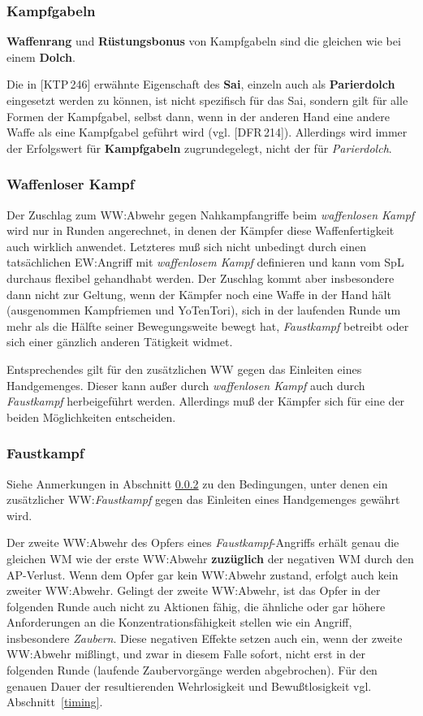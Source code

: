 \documentclass[10pt,a4paper,germanpar]{article}
\begin{document}
\subsubsection{Kampfgabeln}

\textbf{Waffenrang} und \textbf{Rüstungsbonus} von Kampfgabeln sind
die gleichen wie bei einem \textbf{Dolch}.

Die in [KTP\,246] erwähnte Eigenschaft des \textbf{Sai}, einzeln auch
als \textbf{Parierdolch} eingesetzt werden zu können, ist nicht
spezifisch für das Sai, sondern gilt für alle Formen der Kampfgabel,
selbst dann, wenn in der anderen Hand eine andere Waffe als eine
Kampfgabel geführt wird (vgl. [DFR\,214]). Allerdings wird immer der
Erfolgswert für \textbf{Kampfgabeln} zugrundegelegt, nicht der für
\emph{Parierdolch}.

\subsubsection{Waffenloser Kampf}
\label{wlk}

Der Zuschlag zum WW:Abwehr gegen Nahkampfangriffe beim
\emph{waffenlosen Kampf} wird nur in Runden angerechnet, in denen der
Kämpfer diese Waffenfertigkeit auch wirklich anwendet. Letzteres muß
sich nicht unbedingt durch einen tatsächlichen EW:Angriff mit
\emph{waffenlosem Kampf} definieren und kann vom SpL durchaus flexibel
gehandhabt werden. Der Zuschlag kommt aber insbesondere dann nicht zur
Geltung, wenn der Kämpfer noch eine Waffe in der Hand hält
(ausgenommen Kampfriemen und YoTenTori), sich in der laufenden
Runde um mehr als die Hälfte seiner Bewegungsweite bewegt hat,
\emph{Faustkampf} betreibt oder sich einer gänzlich anderen Tätigkeit
widmet.

Entsprechendes gilt für den zusätzlichen WW gegen das Einleiten eines
Handgemenges. Dieser kann außer durch \emph{waffenlosen Kampf} auch
durch \emph{Faustkampf} herbeigeführt werden. Allerdings muß der
Kämpfer sich für eine der beiden Möglichkeiten entscheiden.

\subsubsection{Faustkampf}

Siehe Anmerkungen in Abschnitt \ref{wlk} zu den Bedingungen, unter
denen ein zusätzlicher WW:\emph{Faustkampf} gegen das Einleiten eines
Handgemenges gewährt wird.

Der zweite WW:Abwehr des Opfers eines \emph{Faustkampf}-Angriffs
erhält genau die gleichen WM wie der erste WW:Abwehr
\textbf{zuzüglich} der negativen WM durch den AP-Verlust. Wenn dem
Opfer gar kein WW:Abwehr zustand, erfolgt auch kein zweiter
WW:Abwehr. Gelingt der zweite WW:Abwehr, ist das Opfer in der
folgenden Runde auch nicht zu Aktionen fähig, die ähnliche oder gar
höhere Anforderungen an die Konzentrationsfähigkeit stellen wie ein
Angriff, insbesondere \emph{Zaubern}. Diese negativen Effekte setzen
auch ein, wenn der zweite WW:Abwehr mißlingt, und zwar in diesem Falle
sofort, nicht erst in der folgenden Runde (laufende Zaubervorgänge
werden abgebrochen). Für den genauen Dauer der resultierenden
Wehrlosigkeit und Bewußtlosigkeit vgl. Abschnitt~\ref{timing}.
\end{document}
